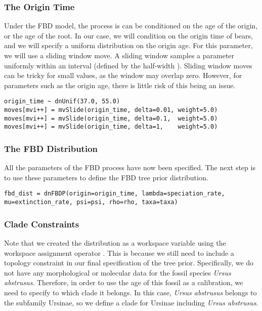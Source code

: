 \subsubsection{The Origin Time}\label{subsub:RB-FBD-Origin}

Under the FBD model, the process is can be conditioned on the age of the origin, or the age of the root.
In our case, we will condition on the origin time of bears, and
we will specify a uniform distribution on the origin age.
For this parameter, we will use a sliding window move. A sliding window samples a parameter uniformly within an interval (defined by the half-width ). 
Sliding window moves can be tricky for small values, as the window may overlap zero. 
However, for parameters such as the origin age, there is little risk of this being an issue.

{\tt \begin{snugshade*}
\begin{lstlisting}
origin_time ~ dnUnif(37.0, 55.0)
moves[mvi++] = mvSlide(origin_time, delta=0.01, weight=5.0)
moves[mvi++] = mvSlide(origin_time, delta=0.1,  weight=5.0)
moves[mvi++] = mvSlide(origin_time, delta=1,    weight=5.0)
\end{lstlisting}
\end{snugshade*}}

\subsubsection{The FBD Distribution}\label{subsub:RB-FBD-dnFBD}

All the parameters of the FBD process have now been specified. 
The next step is to use these parameters to define the FBD tree prior distribution.

{\tt \begin{snugshade*}
\begin{lstlisting}
fbd_dist = dnFBDP(origin=origin_time, lambda=speciation_rate, mu=extinction_rate, psi=psi, rho=rho, taxa=taxa)
\end{lstlisting}
\end{snugshade*}}

\subsubsection{Clade Constraints}\label{subsub:RB-FBD-Constraints}

Note that we created the distribution as a workspace variable using the workspace assignment operator \cl{=}.
This is because we still need to include a topology constraint in our final specification of the tree prior.
Specifically, we do not have any morphological or molecular data for the fossil species \textit{Ursus abstrusus}.
Therefore, in order to use the age of this fossil as a calibration, we need to specify to which clade it belongs.
In this case, \textit{Ursus abstrusus} belongs to the subfamily Ursinae, so we define a clade for Ursinae including \textit{Ursus abstrusus}.

